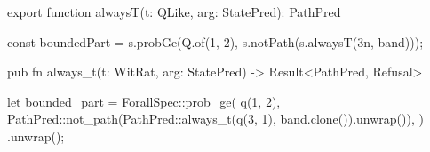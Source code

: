 \begin{tssrc}
export function alwaysT(t: QLike, arg: StatePred): PathPred
\end{tssrc}
\begin{tssrc}
const boundedPart = s.probGe(Q.of(1, 2), s.notPath(s.alwaysT(3n, band)));
\end{tssrc}
\begin{rustsrc}
pub fn always_t(t: WitRat, arg: StatePred) -> Result<PathPred, Refusal>
\end{rustsrc}
\begin{rustsrc}
let bounded_part = ForallSpec::prob_ge(
    q(1, 2),
    PathPred::not_path(PathPred::always_t(q(3, 1), band.clone()).unwrap()),
)
.unwrap();
\end{rustsrc}
